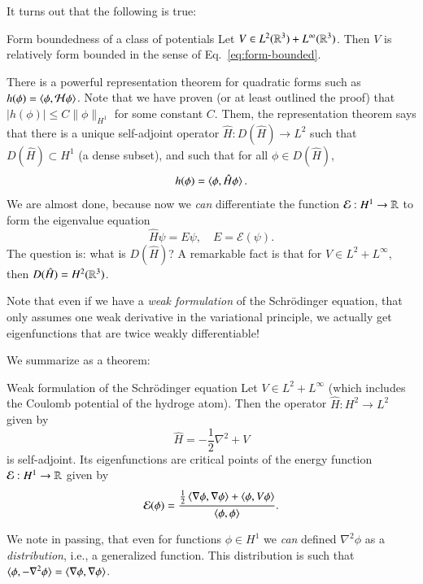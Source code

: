 It turns out that the following is true:
\begin{myLemma}{Form boundedness of a class of potentials}{}
Let $V \in L^2(\mathbb{R}^3) + L^\infty(\mathbb{R}^3)$. Then $V$ is relatively form bounded in the sense of Eq.~\eqref{eq:form-bounded}.
\end{myLemma}

There is a powerful representation theorem for quadratic forms such as $h(\phi) = \braket{\phi,\mathcal{H}\phi}$. Note that we have proven (or at least outlined the proof) that $|h(\phi)| \leq C \|\phi\|_{H^1}$ for some constant $C$. Them, the representation theorem says that there is a unique self-adjoint operator $\hat{H} : D(\hat{H})\to L^2$ such that $D(\hat{H})\subset H^1$ (a dense subset), and such that for all $\phi \in D(\hat{H})$,
\begin{equation}
    h(\phi) = \braket{\phi,\hat{H}\phi}.
\end{equation}
We are almost done, because now we \emph{can} differentiate the function $\mathcal{E} : H^1 \to \mathbb{R}$ to form the eigenvalue equation
\begin{equation}
\hat{H}\psi = E\psi, \quad E = \mathcal{E}(\psi).
\end{equation}
The question is: what is $D(\hat{H})$? A remarkable fact is that for $V \in L^2 + L^\infty$, then $D(\hat{H}) = H^2(\mathbb{R}^3)$.

Note that even if we have a \emph{weak formulation} of the Schr\"odinger equation, that only assumes one weak derivative in the variational principle, we actually get eigenfunctions that are twice weakly differentiable!

We summarize as a theorem:
\begin{myTheorem}{Weak formulation of the Schr\"odinger equation}{}
Let $V \in L^2 + L^\infty$ (which includes the Coulomb potential of the hydroge atom). Then the operator $\hat{H} : H^2\to L^2$ given by
\begin{equation}
    \hat{H} = -\frac{1}{2}\nabla^2 + V
\end{equation}
is self-adjoint. Its eigenfunctions are critical points of the energy function $\mathcal{E} : H^1 \to \mathbb{R}$ given by
\begin{equation}
    \mathcal{E}(\phi) = \frac{\frac{1}{2}\braket{\nabla\phi,\nabla\phi} + \braket{\phi,V\phi}}{\braket{\phi,\phi}}.
\end{equation}
\end{myTheorem}
We note in passing, that even for functions $\phi \in H^1$ we \emph{can} defined $\nabla^2\phi$ as a \emph{distribution}, i.e., a generalized function. This distribution is such that $\braket{\phi,-\nabla^2\phi} = \braket{\nabla\phi,\nabla\phi}$.

